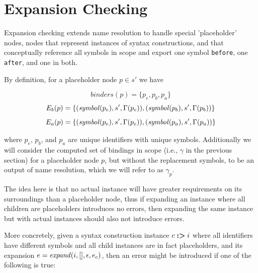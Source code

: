 \documentclass{kththesis}
\begin{document}

\section{Expansion Checking} \label{sec:expansion-checking-formalization}

Expansion checking extends name resolution to handle special 'placeholder' nodes, nodes that represent instances of syntax constructions, and that conceptually reference all symbols in scope and export one symbol \texttt{before}, one \texttt{after}, and one in both.

By definition, for a placeholder node $p \in s'$ we have

$$ binders(p) = \{p_e, p_b, p_a\} $$
$$ E_b(p) = \{(\mathit{symbol}(p_e), s', \Gamma(p_e)), (\mathit{symbol}(p_b), s', \Gamma(p_b))\} $$
$$ E_a(p) = \{(\mathit{symbol}(p_e), s', \Gamma(p_e)), (\mathit{symbol}(p_a), s', \Gamma(p_a))\} $$

where $p_e$, $p_b$, and $p_a$ are unique identifiers with unique symbols. Additionally we will consider the computed set of bindings in scope (i.e., $\gamma$ in the previous section) for a placeholder node $p$, but without the replacement symbols, to be an output of name resolution, which we will refer to as $\gamma_p$.

The idea here is that no actual instance will have greater requirements on its surroundings than a placeholder node, thus if expanding an instance where all children are placeholders introduces no errors, then expanding the same instance but with actual instances should also not introduce errors.

More concretely, given a syntax construction instance $c \mathrel{\textbf{:>}} i$ where all identifiers have different symbols and all child instances are in fact placeholders, and its expansion $e = \mathit{expand}(i, [], \epsilon, e_c)$, then an error might be introduced if one of the following is true:
\end{document}
